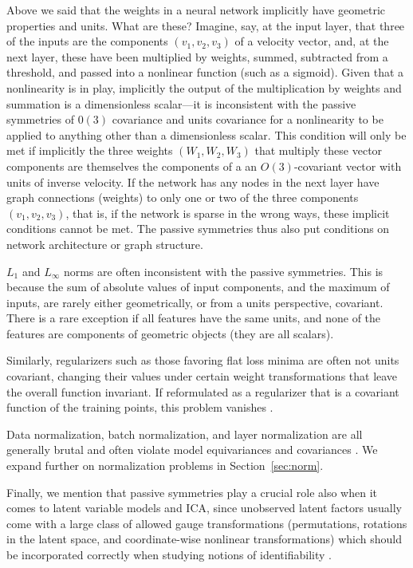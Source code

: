 \documentclass[preprint]{article} %
\newcommand{\sectionname}{Section}
\newcommand{\secref}[1]{\sectionname~\ref{#1}}
\begin{document}
Above we said that the weights in a neural network implicitly have geometric properties and units.
What are these?
Imagine, say, at the input layer, that three of the inputs are the components $(v_1, v_2, v_3)$ of a velocity vector, and, at the next layer, these have been multiplied by weights, summed, subtracted from a threshold, and passed into a nonlinear function (such as a sigmoid).
Given that a nonlinearity is in play, implicitly the output of the multiplication by weights and summation is a dimensionless scalar---it is inconsistent with the passive symmetries of $0(3)$ covariance and units covariance for a nonlinearity to be applied to anything other than a dimensionless scalar.
This condition will only be met if implicitly the three weights $(W_1, W_2, W_3)$ that multiply these vector components are themselves the components of a an $O(3)$-covariant vector with units of inverse velocity.
If the network has any nodes in the next layer have graph connections (weights) to only one or two of the three components $(v_1, v_2, v_3)$, that is, if the network is sparse in the wrong ways, these implicit conditions cannot be met.
The passive symmetries thus also put conditions on network architecture or graph structure.

$L_1$ and $L_\infty$ norms are often inconsistent with the passive symmetries.
This is because the sum of absolute values of input components, and the maximum of inputs, are rarely either geometrically, or from a units perspective, covariant.
There is a rare exception if all features have the same units, and none of the features are components of geometric objects (they are all scalars).

Similarly, regularizers such as those favoring flat loss minima \citep{flatminima,sharpminima,petzka2021relative} are often not units covariant, changing their values under certain weight transformations that leave the overall function invariant. 
If reformulated as a regularizer that is a covariant function of the training points, this problem vanishes \citep{LuxburgBS04}.

Data normalization, batch normalization, and layer normalization are all generally brutal and often violate model equivariances and covariances \citep{aalto2022geometric}.
We expand further on normalization problems in \secref{sec:norm}.

Finally, we mention that passive symmetries play a crucial role also when it comes to latent variable models and ICA, since unobserved latent factors usually come with a large class of allowed gauge transformations (permutations, rotations in the latent space, and coordinate-wise nonlinear transformations) which should be incorporated correctly when studying notions of identifiability \citep{khemakhem2020ice, BucBesSch22}.
\end{document}
